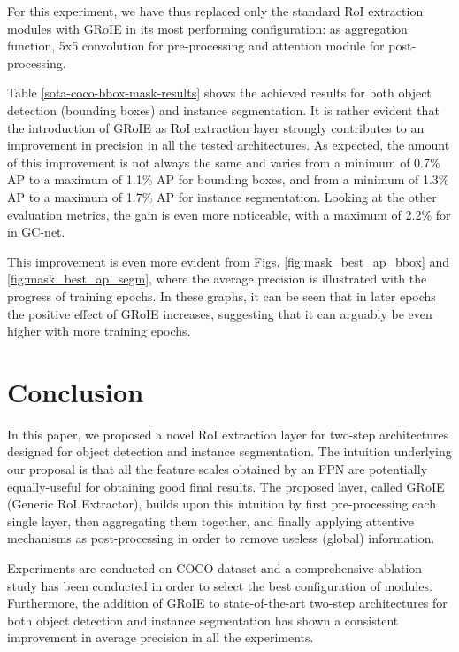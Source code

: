\documentclass[10pt,conference,a4paper]{IEEEtran}
\begin{document}
For this experiment, we have thus replaced only the standard RoI extraction modules with GRoIE in its most performing configuration:  as aggregation function, 5x5 convolution for pre-processing and attention module for post-processing.

Table \ref{sota-coco-bbox-mask-results} shows the achieved results for both object detection (bounding boxes) and instance segmentation.
It is rather evident that the introduction of GRoIE as RoI extraction layer strongly contributes to an improvement in precision in all the tested architectures.
As expected, the amount of this improvement is not always the same and varies from a minimum of 0.7\% AP to a maximum of 1.1\% AP for bounding boxes, and from a minimum of 1.3\% AP to a maximum of 1.7\% AP for instance segmentation.
Looking at the other evaluation metrics, the gain is even more noticeable, with a maximum of 2.2\% for  in GC-net.

This improvement is even more evident from Figs. \ref{fig:mask_best_ap_bbox} and \ref{fig:mask_best_ap_segm}, where the average precision is illustrated with the progress of training epochs.
In these graphs, it can be seen that in later epochs the positive effect of GRoIE increases, suggesting that it can arguably be even higher with more training epochs.
 \section{Conclusion}

In this paper, we proposed a novel RoI extraction layer for two-step architectures designed for object detection and instance segmentation.
The intuition underlying our proposal is that all the feature scales obtained by an FPN are potentially equally-useful for obtaining good final results.
The proposed layer, called GRoIE (Generic RoI Extractor), builds upon this intuition by first pre-processing each single layer, then aggregating them together, and finally applying attentive mechanisms as post-processing in order to remove useless (global) information.

Experiments are conducted on COCO dataset and a comprehensive ablation study has been conducted in order to select the best configuration of modules.
Furthermore, the addition of GRoIE to state-of-the-art two-step architectures for both object detection and instance segmentation has shown a consistent improvement in average precision in all the experiments.
\end{document}

